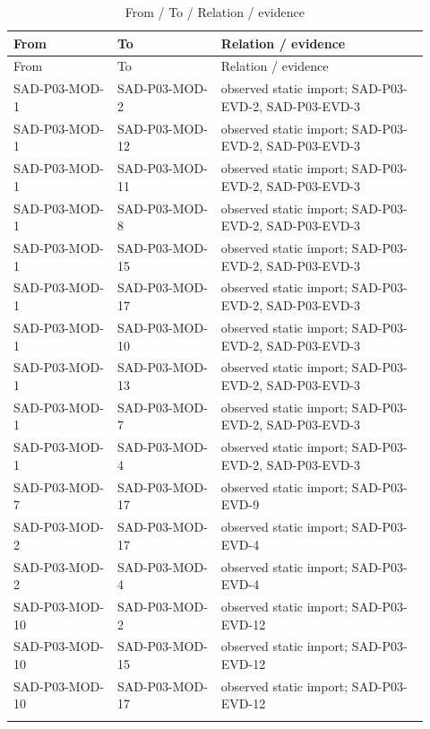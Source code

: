 \documentclass[10pt,letterpaper]{article}
\begin{document}
\begin{longtable}{@{}>{\raggedright\arraybackslash}p{0.23\linewidth}>{\raggedright\arraybackslash}p{0.23\linewidth}>{\raggedright\arraybackslash}p{0.46\linewidth}@{}}
\caption{From / To / Relation / evidence}\\
\toprule From & To & Relation / evidence\\\midrule\endfirsthead
\toprule From & To & Relation / evidence\\\midrule\endhead
SAD-P03-MOD-1 & SAD-P03-MOD-2 & observed static import; SAD-P03-EVD-2, SAD-P03-EVD-3\\\addlinespace
SAD-P03-MOD-1 & SAD-P03-MOD-12 & observed static import; SAD-P03-EVD-2, SAD-P03-EVD-3\\\addlinespace
SAD-P03-MOD-1 & SAD-P03-MOD-11 & observed static import; SAD-P03-EVD-2, SAD-P03-EVD-3\\\addlinespace
SAD-P03-MOD-1 & SAD-P03-MOD-8 & observed static import; SAD-P03-EVD-2, SAD-P03-EVD-3\\\addlinespace
SAD-P03-MOD-1 & SAD-P03-MOD-15 & observed static import; SAD-P03-EVD-2, SAD-P03-EVD-3\\\addlinespace
SAD-P03-MOD-1 & SAD-P03-MOD-17 & observed static import; SAD-P03-EVD-2, SAD-P03-EVD-3\\\addlinespace
SAD-P03-MOD-1 & SAD-P03-MOD-10 & observed static import; SAD-P03-EVD-2, SAD-P03-EVD-3\\\addlinespace
SAD-P03-MOD-1 & SAD-P03-MOD-13 & observed static import; SAD-P03-EVD-2, SAD-P03-EVD-3\\\addlinespace
SAD-P03-MOD-1 & SAD-P03-MOD-7 & observed static import; SAD-P03-EVD-2, SAD-P03-EVD-3\\\addlinespace
SAD-P03-MOD-1 & SAD-P03-MOD-4 & observed static import; SAD-P03-EVD-2, SAD-P03-EVD-3\\\addlinespace
SAD-P03-MOD-7 & SAD-P03-MOD-17 & observed static import; SAD-P03-EVD-9\\\addlinespace
SAD-P03-MOD-2 & SAD-P03-MOD-17 & observed static import; SAD-P03-EVD-4\\\addlinespace
SAD-P03-MOD-2 & SAD-P03-MOD-4 & observed static import; SAD-P03-EVD-4\\\addlinespace
SAD-P03-MOD-10 & SAD-P03-MOD-2 & observed static import; SAD-P03-EVD-12\\\addlinespace
SAD-P03-MOD-10 & SAD-P03-MOD-15 & observed static import; SAD-P03-EVD-12\\\addlinespace
SAD-P03-MOD-10 & SAD-P03-MOD-17 & observed static import; SAD-P03-EVD-12\\\addlinespace

\end{longtable}
\end{document}
